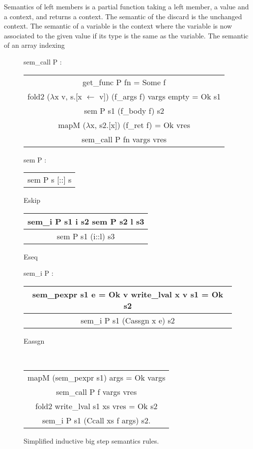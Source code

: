 \documentclass{article}
\begin{document}
Semantics of left members is a partial function taking a left member, a value
and a context, and returns a context.
The semantic of the discard is the unchanged context. The semantic of a variable
is the context where the variable is now associated to the given value if its
type is the same as the variable. The semantic of an array indexing 

\medskip

\begin{figure}
\ttfamily
sem\_call P :
\begin{center}
\begin{tabular}{c}
get\_func P fn = Some f \\
fold2 (\(\lambda\)x v, s.[x \(\leftarrow\) v]) (f\_args f) vargs empty = Ok s1 \\
sem P s1 (f\_body f) s2 \\
mapM (\(\lambda\)x, s2.[x]) (f\_ret f) = Ok vres
\\\hline
sem\_call P fn vargs vres
\end{tabular}
\end{center}

sem P :
\begin{center}
\begin{tabular}{c}
\\\hline
sem P s [::] s
\end{tabular} Eskip\quad
\begin{tabular}{c}
sem\_i P s1 i s2\quad
sem P s2 l s3
\\\hline
sem P s1 (i::l) s3
\end{tabular} Eseq
\end{center}

sem\_i P :
\begin{center}
\begin{tabular}{c}
sem\_pexpr s1 e = Ok v\quad
write\_lval x v s1 = Ok s2
\\\hline
sem\_i P s1 (Cassgn x e) s2
\end{tabular} Eassgn

~

\begin{tabular}{c}
mapM (sem\_pexpr s1) args = Ok vargs \\
sem\_call P f vargs vres \\
fold2 write\_lval s1 xs vres = Ok s2
\\\hline
sem\_i P s1 (Ccall xs f args) s2.
\end{tabular} \raisebox{-\baselineskip}{Ecall}
\end{center}
\normalfont%
\caption{Simplified inductive big step semantics rules.}
\end{figure}
\end{document}
